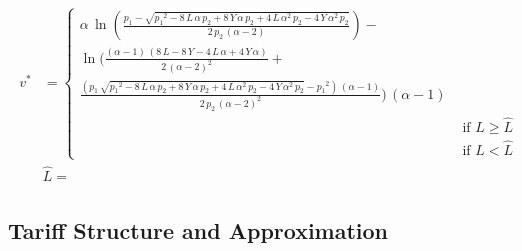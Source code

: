 \documentclass[12pt]{article}
\begin{document}
\begin{align}\label{eq:vstar}
\begin{split}
v^{*} &= 
\begin{cases}
\alpha \,\ln(\frac{p_{1}-\sqrt{{p_{1}}^2-8\,L\,\alpha \,p_{2}+8\,Y\,\alpha \,p_{2}+4\,L\,\alpha ^2\,p_{2}-4\,Y\,\alpha ^2\,p_{2}}}{2\,p_{2}\,(\alpha -2)})- \\ \ln(\frac{(\alpha -1)\,(8\,L-8\,Y-4\,L\,\alpha +4\,Y\,\alpha )}{2\,{(\alpha -2)}^2}+ \\
\frac{(p_{1}\,\sqrt{{p_{1}}^2-8\,L\,\alpha \,p_{2}+8\,Y\,\alpha \,p_{2}+4\,L\,\alpha ^2\,p_{2}-4\,Y\,\alpha ^2\,p_{2}}-{p_{1}}^2)\,(\alpha -1)}{2\,p_{2}\,{(\alpha -2)}^2})\,(\alpha -1)\\
 &\text{ if } L \geq \widehat{L} \\
 &\text{ if } L < \widehat{L}
\end{cases} \\
&\widehat{L} = 
\end{split}
\end{align}



\subsection{Tariff Structure and Approximation}\label{appendix:tariff}

\end{document}

